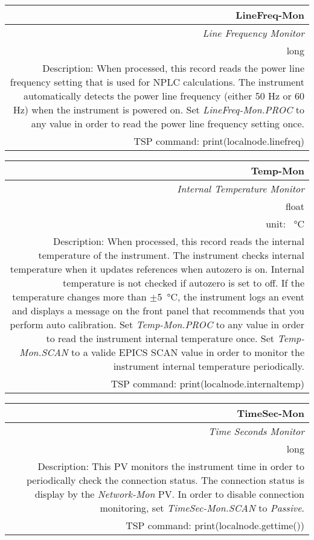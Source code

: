 \documentclass[openany]{article}
\begin{document}
		\begin{tabular}{N}
			\hline
			\bfseries LineFreq-Mon\label{pv:linefreq-mon} \\ \hline
			\emph{Line Frequency Monitor} \\
			long \\
			Description: When processed, this record reads the power line frequency setting that is used for NPLC calculations. The instrument automatically detects the power line frequency (either 50 Hz or 60 Hz) when the instrument is powered on. Set \emph{LineFreq-Mon.PROC} to any value in order to read the power line frequency setting once. \\
			TSP command: print(localnode.linefreq)
		\end{tabular}

		\begin{tabular}{N}
			\hline
			\bfseries Temp-Mon\label{pv:temp-mon} \\ \hline
			\emph{Internal Temperature Monitor} \\
			float \\
			unit: \SI{}{\degreeCelsius} \\
			Description: When processed, this record reads the internal temperature of the instrument. The instrument checks internal temperature when it updates references when autozero is on. Internal temperature is not checked if autozero is set to off. If the temperature changes more than $\pm$\SI{5}{\degreeCelsius}, the instrument logs an event and displays a message on the front panel that recommends that you perform auto calibration. Set \emph{Temp-Mon.PROC} to any value in order to read the instrument internal temperature once. Set \emph{Temp-Mon.SCAN} to a valide EPICS SCAN value in order to monitor the instrument internal temperature periodically. \\
			TSP command: print(localnode.internaltemp)
		\end{tabular}

		\begin{tabular}{N}
			\hline
			\bfseries TimeSec-Mon\label{pv:timesec-mon} \\ \hline
			\emph{Time Seconds Monitor} \\
			long \\
			Description: This PV monitors the instrument time in order to periodically check the connection status. The connection status is display by the \emph{Network-Mon} PV. In order to disable connection monitoring, set \emph{TimeSec-Mon.SCAN} to \emph{Passive}. \\
			TSP command: print(localnode.gettime())
		\end{tabular}
\end{document}
